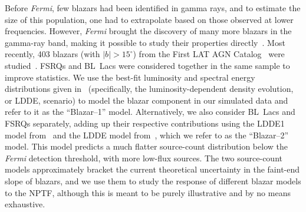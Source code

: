 Before \emph{Fermi}, few blazars had been identified in gamma rays, and to estimate the size of this population, one had to extrapolate based on those observed at lower frequencies.  However, \emph{Fermi} brought the discovery of many more blazars in the gamma-ray band, making it possible to study their properties directly~\cite{Collaboration:2010gqa, Ajello:2011zi,Ajello:2013lka, DiMauro:2013zfa, Giommi:2015ela, Padovani:2014cha}.  Most recently, 403 blazars (with $|b| > 15^\circ$) from the First LAT AGN Catalog~\cite{Abdo:2010ge} were studied~\cite{Ajello:2015mfa}.  FSRQs and BL~Lacs were considered together in the same sample to improve statistics.  We use the best-fit luminosity and spectral energy distributions given in~\cite{Ajello:2015mfa} (specifically, the luminosity-dependent density evolution, or LDDE, scenario) to model the blazar component in our simulated data and refer to it as the ``Blazar--1'' model.  Alternatively, we also consider BL~Lacs and FSRQs separately, adding up their respective contributions using the LDDE1 model from~\cite{Ajello:2013lka} and the LDDE model from~\cite{Ajello:2011zi}, which we refer to as the ``Blazar--2'' model. This model predicts a much flatter source-count distribution below the \emph{Fermi} detection threshold, with more low-flux sources. The two source-count models approximately bracket the current theoretical uncertainty in the faint-end slope of blazars, and we use them to study the response of different blazar models to the NPTF, although this is meant to be purely illustrative and by no means exhaustive.

